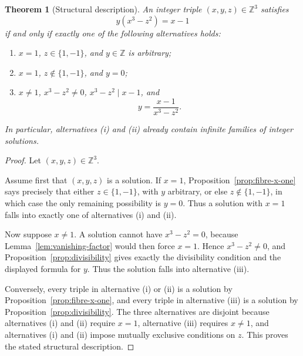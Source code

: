 \documentclass[11pt]{article}
\newtheorem{theorem}{Theorem}
\begin{document}
\begin{theorem}[Structural description]\label{thm:structural}
An integer triple \((x,y,z)\in\mathbb Z^3\) satisfies
\[
    y(x^3-z^2)=x-1
\]
if and only if exactly one of the following alternatives holds:
\begin{enumerate}[label=\textup{(\roman*)}]
    \item \(x=1\), \(z\in\{1,-1\}\), and \(y\in\mathbb Z\) is arbitrary;
    \item \(x=1\), \(z\notin\{1,-1\}\), and \(y=0\);
    \item \(x\ne 1\), \(x^3-z^2\ne 0\), \(x^3-z^2\mid x-1\), and
    \[
        y=\frac{x-1}{x^3-z^2}.
    \]
\end{enumerate}
In particular, alternatives \textup{(i)} and \textup{(ii)} already contain infinite families of integer solutions.
\end{theorem}

\begin{proof}
Let \((x,y,z)\in\mathbb Z^3\).

Assume first that \((x,y,z)\) is a solution.  If \(x=1\), Proposition~\ref{prop:fibre-x-one} says precisely that either \(z\in\{1,-1\}\), with \(y\) arbitrary, or else \(z\notin\{1,-1\}\), in which case the only remaining possibility is \(y=0\).  Thus a solution with \(x=1\) falls into exactly one of alternatives \textup{(i)} and \textup{(ii)}.

Now suppose \(x\ne 1\).  A solution cannot have \(x^3-z^2=0\), because Lemma~\ref{lem:vanishing-factor} would then force \(x=1\).  Hence \(x^3-z^2\ne 0\), and Proposition~\ref{prop:divisibility} gives exactly the divisibility condition and the displayed formula for \(y\).  Thus the solution falls into alternative \textup{(iii)}.

Conversely, every triple in alternative \textup{(i)} or \textup{(ii)} is a solution by Proposition~\ref{prop:fibre-x-one}, and every triple in alternative \textup{(iii)} is a solution by Proposition~\ref{prop:divisibility}.  The three alternatives are disjoint because alternatives \textup{(i)} and \textup{(ii)} require \(x=1\), alternative \textup{(iii)} requires \(x\ne 1\), and alternatives \textup{(i)} and \textup{(ii)} impose mutually exclusive conditions on \(z\).  This proves the stated structural description.
\end{proof}
\end{document}
